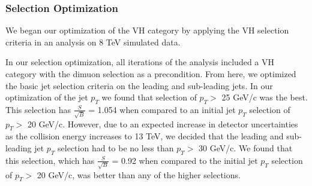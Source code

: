 \documentclass[12pt]{article}
\begin{document}
\subsubsection{Selection Optimization}

We began our optimization of the VH category by applying the VH selection criteria in an analysis on 8 TeV simulated data. 

In our selection optimization, all iterations of the analysis included a VH category with the dimuon selection as a precondition. 
From here, we optimized the basic jet selection criteria on the leading and sub-leading jets. 
In our optimization of the jet $p_{T}$ we found that selection of $p_{T}>$ 25 GeV/c was the best. 
This selection has $\frac{S}{\sqrt{B}}$ = 1.054 when compared to an initial jet $p_{T}$ selection of $p_{T}>$ 20 GeV/c. 
However, due to an expected increase in detector uncertainties as the collision energy increases to 13 TeV, 
we decided that the leading and sub-leading jet $p_{T}$ selection had to be no less than $p_{T}>$ 30 GeV/c. 
We found that this selection, which has $\frac{S}{\sqrt{B}}$ = 0.92 when compared to the initial jet $p_{T}$ selection of $p_{T}>$ 20 GeV/c, 
was better than any of the higher selections. 
\end{document}
